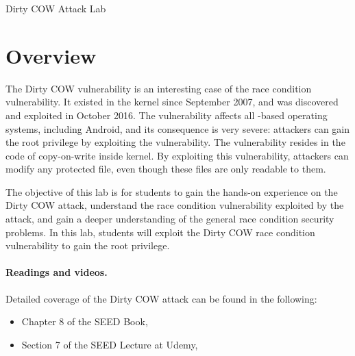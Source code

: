 



\newcommand{\cowFigs}{./Figs}





\begin{center}
{\LARGE Dirty COW Attack Lab}
\end{center}




\section{Overview}

The Dirty COW vulnerability is an interesting case of
the race condition vulnerability. It existed in the \linux kernel since
September 2007, and was discovered and exploited in October 2016.
The vulnerability affects all \linux-based operating systems, including
Android, and its consequence is very severe: attackers can gain the root
privilege by exploiting the vulnerability. The vulnerability resides
in the code of copy-on-write inside \linux kernel. By exploiting this vulnerability, attackers
can modify any protected file, even though these files are only readable to them.

The objective of this lab is for students to gain the hands-on experience on the Dirty COW
attack, understand the race condition vulnerability exploited by the attack, and 
gain a deeper understanding of the general race condition security problems. In this lab,
students will exploit the Dirty COW race condition vulnerability to gain the root privilege.  


\paragraph{Readings and videos.}
Detailed coverage of the Dirty COW attack can be found in the following:

\begin{itemize}
\item Chapter 8 of the SEED Book, \seedbook
\item Section 7 of the SEED Lecture at Udemy, \seedcsvideo
\end{itemize}


